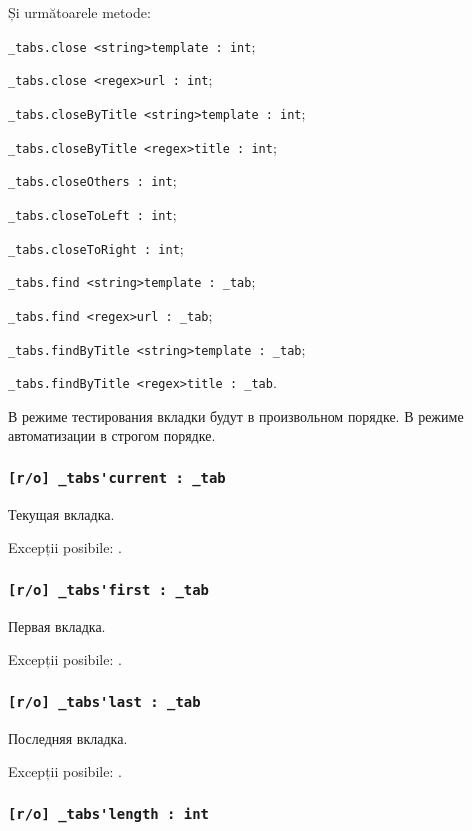 Și următoarele metode:
\begin{icItems}
	\item \lstinline|_tabs.close <string>template : int|;
	\item \lstinline|_tabs.close <regex>url : int|;
	\item \lstinline|_tabs.closeByTitle <string>template : int|;
	\item \lstinline|_tabs.closeByTitle <regex>title : int|;
	\item \lstinline|_tabs.closeOthers : int|;
	\item \lstinline|_tabs.closeToLeft : int|;
	\item \lstinline|_tabs.closeToRight : int|;
	\item \lstinline|_tabs.find <string>template : _tab|;
	\item \lstinline|_tabs.find <regex>url : _tab|;
	\item \lstinline|_tabs.findByTitle <string>template : _tab|;
	\item \lstinline|_tabs.findByTitle <regex>title : _tab|.
\end{icItems}

В режиме тестирования вкладки будут в произвольном порядке. В режиме автоматизации в строгом порядке.

\subsubsection{\lstinline|[r/o] _tabs'current : _tab|}

Текущая вкладка.

Excepții posibile: .

\subsubsection{\lstinline|[r/o] _tabs'first : _tab|}

Первая вкладка.

Excepții posibile: .

\subsubsection{\lstinline|[r/o] _tabs'last : _tab|}

Последняя вкладка.

Excepții posibile: .

\subsubsection{\lstinline|[r/o] _tabs'length : int|}

